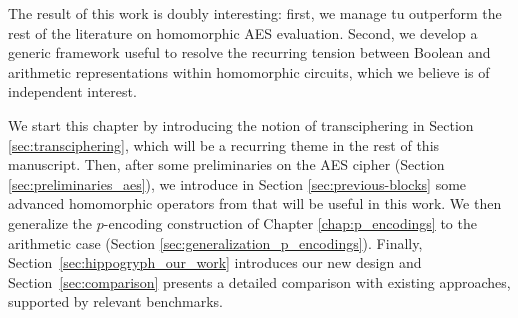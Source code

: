 The result of this work is doubly interesting: first, we manage tu outperform the rest of the literature on homomorphic AES evaluation. Second, we develop a generic framework useful to resolve the recurring tension between Boolean and arithmetic representations within homomorphic circuits, which we believe is of independent interest.


We start this chapter by introducing the notion of transciphering in Section \ref{sec:transciphering}, which will be a recurring theme in the rest of this manuscript. Then, after some preliminaries on the AES cipher (Section \ref{sec:preliminaries_aes}), we introduce in Section \ref{sec:previous-blocks} some advanced homomorphic operators from \cite{DBLP:conf/wahc/TramaCBS23} that will be useful in this work. We then generalize the $p$-encoding construction of Chapter \ref{chap:p_encodings} to the arithmetic case (Section \ref{sec:generalization_p_encodings}). Finally, Section~\ref{sec:hippogryph_our_work} introduces our new design and Section~\ref{sec:comparison} presents a detailed comparison with existing approaches, supported by relevant benchmarks.




